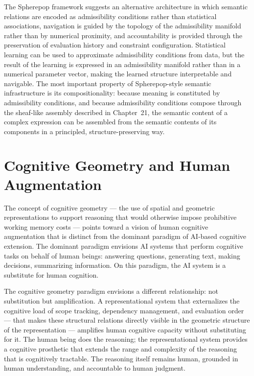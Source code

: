 \documentclass[12pt,openany]{book}
\theoremstyle{plain}
\theoremstyle{definition}
\theoremstyle{remark}
\begin{document}
The Spherepop framework suggests an alternative architecture in which semantic relations are encoded as admissibility conditions rather than statistical associations, navigation is guided by the topology of the admissibility manifold rather than by numerical proximity, and accountability is provided through the preservation of evaluation history and constraint configuration. Statistical learning can be used to approximate admissibility conditions from data, but the result of the learning is expressed in an admissibility manifold rather than in a numerical parameter vector, making the learned structure interpretable and navigable. The most important property of Spherepop-style semantic infrastructure is its compositionality: because meaning is constituted by admissibility conditions, and because admissibility conditions compose through the sheaf-like assembly described in Chapter~21, the semantic content of a complex expression can be assembled from the semantic contents of its components in a principled, structure-preserving way.

\section{Cognitive Geometry and Human Augmentation}

The concept of cognitive geometry — the use of spatial and geometric representations to support reasoning that would otherwise impose prohibitive working memory costs — points toward a vision of human cognitive augmentation that is distinct from the dominant paradigm of AI-based cognitive extension. The dominant paradigm envisions AI systems that perform cognitive tasks on behalf of human beings: answering questions, generating text, making decisions, summarizing information. On this paradigm, the AI system is a substitute for human cognition.

The cognitive geometry paradigm envisions a different relationship: not substitution but amplification. A representational system that externalizes the cognitive load of scope tracking, dependency management, and evaluation order — that makes these structural relations directly visible in the geometric structure of the representation — amplifies human cognitive capacity without substituting for it. The human being does the reasoning; the representational system provides a cognitive prosthetic that extends the range and complexity of the reasoning that is cognitively tractable. The reasoning itself remains human, grounded in human understanding, and accountable to human judgment.
\end{document}
